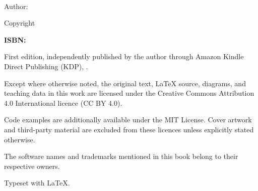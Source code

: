 \begin{titlepage}
  \vspace*{0.28\textheight}
  \small
  \noindent\textbf{\BookTitle}\\
  \BookSubtitle

  \medskip
  \noindent Author: \BookAuthor

  \medskip
  \noindent Copyright \textcopyright\ \BookYear\ \BookAuthor

  \medskip
  \noindent\textbf{ISBN:} \BookISBN

  \medskip
  \noindent First edition, independently published by the author through
  Amazon Kindle Direct Publishing (KDP), \BookYear.

  \medskip
  \noindent Except where otherwise noted, the original text, \LaTeX{} source,
  diagrams, and teaching data in this work are licensed under the Creative
  Commons Attribution 4.0 International licence (CC BY 4.0).

  \medskip
  \noindent Code examples are additionally available under the MIT License.
  Cover artwork and third-party material are excluded from these licences
  unless explicitly stated otherwise.

  \medskip
  \noindent The software names and trademarks mentioned in this book belong
  to their respective owners.

  \vfill
  \noindent Typeset with \LaTeX{}.
\end{titlepage}
